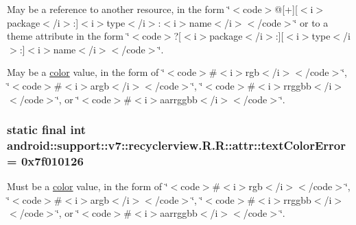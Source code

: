 May be a reference to another resource, in the form \char`\"{}$<$code$>$@\mbox{[}+\mbox{]}\mbox{[}$<$i$>$package$<$/i$>$:\mbox{]}$<$i$>$type$<$/i$>$:$<$i$>$name$<$/i$>$$<$/code$>$\char`\"{} or to a theme attribute in the form \char`\"{}$<$code$>$?\mbox{[}$<$i$>$package$<$/i$>$:\mbox{]}\mbox{[}$<$i$>$type$<$/i$>$:\mbox{]}$<$i$>$name$<$/i$>$$<$/code$>$\char`\"{}. 

May be a \hyperlink{classandroid_1_1support_1_1v7_1_1recyclerview_1_1_r_1_1color}{color} value, in the form of \char`\"{}$<$code$>$\#$<$i$>$rgb$<$/i$>$$<$/code$>$\char`\"{}, \char`\"{}$<$code$>$\#$<$i$>$argb$<$/i$>$$<$/code$>$\char`\"{}, \char`\"{}$<$code$>$\#$<$i$>$rrggbb$<$/i$>$$<$/code$>$\char`\"{}, or \char`\"{}$<$code$>$\#$<$i$>$aarrggbb$<$/i$>$$<$/code$>$\char`\"{}. \hypertarget{classandroid_1_1support_1_1v7_1_1recyclerview_1_1_r_1_1attr_897bec4bd16605b6d50c07acb72d0d82}{
\subsubsection[{textColorError}]{\setlength{\rightskip}{0pt plus 5cm}static final int android::support::v7::recyclerview.R.R::attr::textColorError = 0x7f010126}}
\label{classandroid_1_1support_1_1v7_1_1recyclerview_1_1_r_1_1attr_897bec4bd16605b6d50c07acb72d0d82}


Must be a \hyperlink{classandroid_1_1support_1_1v7_1_1recyclerview_1_1_r_1_1color}{color} value, in the form of \char`\"{}$<$code$>$\#$<$i$>$rgb$<$/i$>$$<$/code$>$\char`\"{}, \char`\"{}$<$code$>$\#$<$i$>$argb$<$/i$>$$<$/code$>$\char`\"{}, \char`\"{}$<$code$>$\#$<$i$>$rrggbb$<$/i$>$$<$/code$>$\char`\"{}, or \char`\"{}$<$code$>$\#$<$i$>$aarrggbb$<$/i$>$$<$/code$>$\char`\"{}. 


